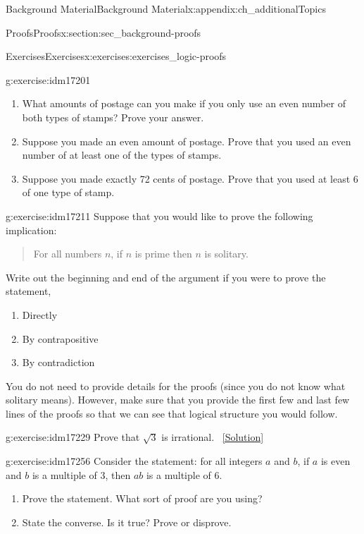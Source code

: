\documentclass[oneside,10pt,]{book}
\numberwithin{equation}{chapter}
\begin{document}
\begin{appendixptx}{Background Material}{}{Background Material}{}{}{x:appendix:ch_additionalTopics}
\begin{sectionptx}{Proofs}{}{Proofs}{}{}{x:section:sec_background-proofs}
\begin{exercises-subsection}{Exercises}{}{Exercises}{}{}{x:exercises:exercises_logic-proofs}
\begin{divisionexercise}{4}{}{}{g:exercise:idm17201}
\begin{enumerate}[label=(\alph*)]
\item{}What amounts of postage can you make if you only use an even number of both types of stamps? Prove your answer.%
\item{}Suppose you made an even amount of postage. Prove that you used an even number of at least one of the types of stamps.%
\item{}Suppose you made exactly 72 cents of postage. Prove that you used at least 6 of one type of stamp.%
\end{enumerate}
%
\end{divisionexercise}%
\begin{divisionexercise}{5}{}{}{g:exercise:idm17211}%
Suppose that you would like to prove the following implication:%
\begin{quote}%
For all numbers \(n\), if \(n\) is prime then \(n\) is solitary.%
\end{quote}
Write out the beginning and end of the argument if you were to prove the statement,%
\par
%
\begin{enumerate}[label=(\alph*)]
\item{}Directly %
\item{}By contrapositive %
\item{}By contradiction %
\end{enumerate}
%
\par
You do not need to provide details for the proofs (since you do not know what solitary means). However, make sure that you provide the first few and last few lines of the proofs so that we can see that logical structure you would follow.%
\end{divisionexercise}%
\begin{divisionexercise}{6}{}{}{g:exercise:idm17229}%
Prove that \(\sqrt 3\) is irrational.%
\qquad~\hfill{\tiny\hyperlink{g:solution:idm17233-main}{[Solution]}}\end{divisionexercise}%
\begin{divisionexercise}{7}{}{}{g:exercise:idm17256}%
Consider the statement: for all integers \(a\) and \(b\), if \(a\) is even and \(b\) is a multiple of 3, then \(ab\) is a multiple of 6.%
\par
%
\begin{enumerate}[label=(\alph*)]
\item{}Prove the statement. What sort of proof are you using?%
\item{}State the converse. Is it true? Prove or disprove.%
\end{enumerate}

\end{divisionexercise}
\end{exercises-subsection}
\end{sectionptx}
\end{appendixptx}
\end{document}
